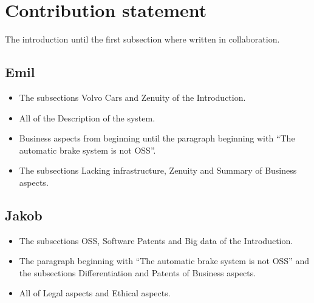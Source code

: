 \documentclass[conference]{IEEEtran}
\begin{document}
\begin{thebibliography}{00}
\end{thebibliography}

\newpage
\appendix
\section*{Contribution statement}
The introduction until the first subsection where written in collaboration.
\subsection{Emil}
\begin{itemize}
	\item
	The subsections Volvo Cars and Zenuity of  the Introduction.
	\item
	All of the Description of the system.
	\item
	Business aspects from beginning until the paragraph beginning with ``The automatic brake system is not OSS''.
	\item
	The subsections Lacking infrastructure, Zenuity and Summary of Business aspects.
\end{itemize}
\subsection{Jakob}
\begin{itemize}
	\item
	The subsections OSS, Software Patents and Big data of the Introduction.
	\item
	The paragraph beginning with ``The automatic brake system is not OSS'' and the subsections Differentiation and Patents of Business aspects.
	\item
	All of Legal aspects and Ethical aspects.
\end{itemize}
\end{document}
